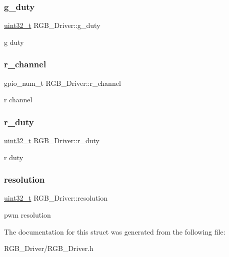 \subsubsection{\texorpdfstring{g\+\_\+duty}{g\_duty}}
{\footnotesize\ttfamily \hyperlink{vl53l0x__types_8h_a435d1572bf3f880d55459d9805097f62}{uint32\+\_\+t} R\+G\+B\+\_\+\+Driver\+::g\+\_\+duty}

g duty \mbox{\label{structRGB__Driver_a899a4207afcd1b6b3dc55e9dbcc4b9ee}} 
\subsubsection{\texorpdfstring{r\+\_\+channel}{r\_channel}}
{\footnotesize\ttfamily gpio\+\_\+num\+\_\+t R\+G\+B\+\_\+\+Driver\+::r\+\_\+channel}

r channel \mbox{\label{structRGB__Driver_a66dea398a8883deef0901c71be75a980}} 
\subsubsection{\texorpdfstring{r\+\_\+duty}{r\_duty}}
{\footnotesize\ttfamily \hyperlink{vl53l0x__types_8h_a435d1572bf3f880d55459d9805097f62}{uint32\+\_\+t} R\+G\+B\+\_\+\+Driver\+::r\+\_\+duty}

r duty \mbox{\label{structRGB__Driver_a2d794ede506e3bb49b2f3ae4c772c418}} 
\subsubsection{\texorpdfstring{resolution}{resolution}}
{\footnotesize\ttfamily \hyperlink{vl53l0x__types_8h_a435d1572bf3f880d55459d9805097f62}{uint32\+\_\+t} R\+G\+B\+\_\+\+Driver\+::resolution}

pwm resolution 

The documentation for this struct was generated from the following file\+:\begin{DoxyCompactItemize}
\item 
R\+G\+B\+\_\+\+Driver/R\+G\+B\+\_\+\+Driver.\+h\end{DoxyCompactItemize}
